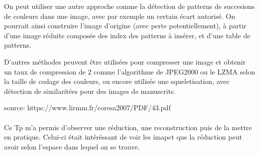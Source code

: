 \documentclass{article}
\begin{document}
On peut utiliser une autre approche comme la détection de patterns de succesions de couleurs dans une image, avec par exemple un certain écart autorisé. On pourrait ainsi construire l'image d'origine (avec perte potentiellement), à partir d'une image réduite composée des index des patterns à insérer, et d'une table de patterns.

D'autres méthodes peuvent être utilisées pour compresser une image et obtenir un taux de compression de 2 comme l'algorithme de JPEG2000 ou le LZMA selon la taille de codage des couleurs, ou encore utilisée une squeletisation, avec détection de similaritées pour des images de manuscrits.

source: https://www.lirmm.fr/coresa2007/PDF/43.pdf
\\\\
Ce Tp m'a permis d'observer une réduction, une reconstruction puis de la mettre en pratique. Celui-ci était intéréssant de voir les imapct que la réduction peut avoir selon l'espace dans lequel on se trouve.
\end{document}
